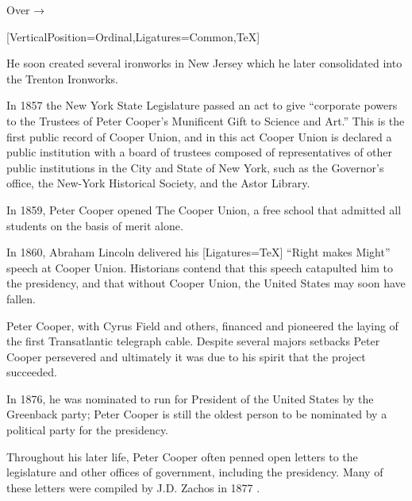 \documentclass{article}
\begin{document}
\hfill Over { →}
%
%
\newpage{}
%
%
\begin{minipage}[t]{0.46\linewidth}
[VerticalPosition=Ordinal,Ligatures={Common,TeX}]
\fontsize{11pt}{13pt}\selectfont
\raggedright
\upshape
\begin{enumList}
\setcounter{enumListi}{\value{enumTemp}}

\item He soon created several ironworks in New Jersey which he later
consolidated into the { Trenton Ironworks}.

\item In 1857 the New York State Legislature passed an act to give ``corporate
powers to the Trustees of Peter Cooper's Munificent Gift to Science and Art.''
This is the first public record of Cooper Union, and in this act Cooper Union is
declared a { public institution with a board of
trustees composed of representatives of other public institutions in the City and
State of New York}, such as the Governor's office, the New-York Historical
Society, and the Astor Library.

\item In 1859, Peter Cooper opened The Cooper Union, a {
free school that admitted all students on the basis of merit alone.}
\item In 1860, { Abraham Lincoln} delivered his
{[Ligatures=TeX] ``Right makes Might''} speech at Cooper
Union.
Historians contend that this speech catapulted him to the presidency, and that
{ without Cooper Union, the United States may soon have
fallen.}

\item Peter Cooper, with Cyrus Field and others, financed and
pioneered the laying of the { first Transatlantic
telegraph cable}. Despite several majors setbacks Peter Cooper persevered and
ultimately it was due to his spirit that the project succeeded.

\item In 1876, he was { nominated to run for President of
the United States} by the Greenback party; Peter Cooper is still the
{ oldest person} to be nominated by a political party for
the presidency.

\item Throughout his later life, Peter Cooper often penned open letters to the
legislature and other offices of government, including the presidency. Many of
these letters were compiled by J.D. Zachos in 1877 \cite{opinions}.


\end{enumList}
\end{minipage}
\end{document}
